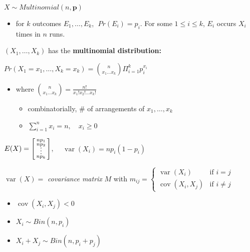 \documentclass[10pt, landscape]{article}
\newcommand{\cov}{\mathop{\mathrm{cov}}}
\newcommand{\var}{\mathop{\mathrm{var}}}
\DeclareRobustCommand{\svdots}{%
  \vbox{%
    \baselineskip=0.33333\normalbaselineskip
    \lineskiplimit=0pt
    \hbox{.}\hbox{.}\hbox{.}%
    \kern-0.2\baselineskip
  }%
}
\begin{document}
\begin{multicols*}{4}
  $X \sim Multinomial(n, \mathbf{p})$ 

  \begin{itemize}
    \item for $k$ outcomes $E_1, \dots, E_k$, $\; Pr(E_i) = p_i$.
      For some $1 \leq i \leq k$, $E_i$ occurs $X_i$ times in $n$ runs.
  \end{itemize}

  $(X_1, \dots, X_k)$ has the \textbf{multinomial distribution:}

  \begin{tightcenter}
    \( {\displaystyle{ Pr(X_1 = x_1, \dots, X_k = x_k) = \binom{n}{x_1 \dots x_k} \Pi^k_{i=1} p_i^{x_i} }} \)   
  \end{tightcenter}

  \begin{itemize}
    \item where $\binom{n}{x_1 \dots x_k} = \frac{n!}{x_1! x_2! \dots x_k!}$
      \begin{itemize}
        \item combinatorially, \# of arrangements of $x_1, \dots, x_k$
        \item $\sum^n_{i=1}x_i = n, \quad x_i \ge 0$
      \end{itemize}
  \end{itemize}

  \begin{tightcenter}
    $E(X) = \left[\begin{smallmatrix}np_1 \\ np_2 \\ \svdots \\ np_k\end{smallmatrix}\right]$,  
    $\quad \var(X_i) = np_i (1-p_i)$

    $\var(X) =$ \textit{covariance matrix} $M$ with $m_{ij} = \begin{cases}
      \var(X_i) & \text{if }i=j
      \\ \cov(X_i, X_j) & \text{if }i \neq j
    \end{cases} $
  \end{tightcenter}

  \begin{itemize}
    \item $\cov(X_i, X_j) < 0$
    \item $X_i \sim Bin(n, p_i)$
    \item $X_i + X_j \sim Bin(n, p_i + p_j)$
  \end{itemize}



\end{multicols*}
\end{document}
